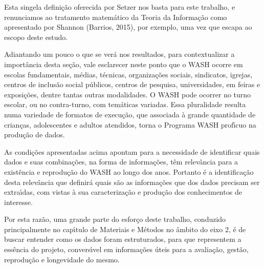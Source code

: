 \documentclass[
12pt,		%
openright,	%
twoside,  %
a4paper,			%
chapter=TITLE,		%
english,			%
french,				%
spanish,			%
brazil				%
]{USPSC-classe/USPSC}
\begin{document}
Esta singela defini\c{c}\~ao oferecida por Setzer nos basta para este trabalho, e renunciamos ao tratamento matem\'atico da Teoria da Informa\c{c}\~ao como apresentado por Shannon (Barrios, 2015), por exemplo, uma vez que escapa ao escopo deste estudo.










Adiantando um pouco o que se ver\'a nos resultados, para contextualizar a import\^ancia desta se\c{c}\~ao, vale esclarecer neste ponto que o WASH ocorre  em escolas fundamentais, m\'edias, t\'ecnicas, organiza\c{c}\~oes sociais, sindicatos, igrejas, centros de inclus\~ao social p\'ublicos, centros de pesquisa, universidades, em feiras e exposi\c{c}\~oes, dentre tantas outras modalidades. O WASH pode ocorrer no turno escolar, ou no contra-turno, com tem\'aticas variadas.  Essa pluralidade resulta numa variedade de formatos de execu\c{c}\~ao, que associada \`a grande quantidade de crian\c{c}as, adolescentes e adultos atendidos, torna o Programa WASH prof\'{\i}cuo na produ\c{c}\~ao de dados.










As condi\c{c}\~oes apresentadas acima apontam para a necessidade de identificar quais dados e suas combina\c{c}\~oes, na forma de informa\c{c}\~oes, t\^em relev\^ancia para a exist\^encia e reprodu\c{c}\~ao do WASH ao longo dos anos. Portanto \'e a identifica\c{c}\~ao desta relev\^ancia que definir\'a quais s\~ao as informa\c{c}\~oes que dos dados precisam ser extra\'{\i}das, com vistas \`a sua caracteriza\c{c}\~ao e produ\c{c}\~ao dos conhecimentos de interesse.










Por esta raz\~ao, uma grande parte do esfor\c{c}o deste trabalho, conduzido principalmente no cap\'{\i}tulo de Materiais e M\'etodos no \^ambito do eixo 2, \'e de buscar entender como os dados foram estruturados, para que representem a ess\^encia do projeto, convers\'{\i}vel em informa\c{c}\~oes \'uteis para a avalia\c{c}\~ao, gest\~ao, reprodu\c{c}\~ao e longevidade do mesmo.
\end{document}
